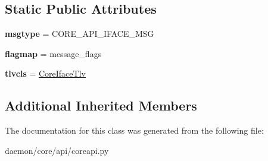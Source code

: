\subsection*{Static Public Attributes}
\begin{DoxyCompactItemize}
\item 
\hypertarget{classcore_1_1api_1_1coreapi_1_1_core_iface_message_a20b18d56dee1aea2c7c269857b86dbe4}{{\bfseries msgtype} = C\+O\+R\+E\+\_\+\+A\+P\+I\+\_\+\+I\+F\+A\+C\+E\+\_\+\+M\+S\+G}\label{classcore_1_1api_1_1coreapi_1_1_core_iface_message_a20b18d56dee1aea2c7c269857b86dbe4}

\item 
\hypertarget{classcore_1_1api_1_1coreapi_1_1_core_iface_message_a67f2f75193b8be6426189124d743f528}{{\bfseries flagmap} = message\+\_\+flags}\label{classcore_1_1api_1_1coreapi_1_1_core_iface_message_a67f2f75193b8be6426189124d743f528}

\item 
\hypertarget{classcore_1_1api_1_1coreapi_1_1_core_iface_message_a637654ed48a2d4f4653986b22f6e4839}{{\bfseries tlvcls} = \hyperlink{classcore_1_1api_1_1coreapi_1_1_core_iface_tlv}{Core\+Iface\+Tlv}}\label{classcore_1_1api_1_1coreapi_1_1_core_iface_message_a637654ed48a2d4f4653986b22f6e4839}

\end{DoxyCompactItemize}
\subsection*{Additional Inherited Members}


The documentation for this class was generated from the following file\+:\begin{DoxyCompactItemize}
\item 
daemon/core/api/coreapi.\+py\end{DoxyCompactItemize}
